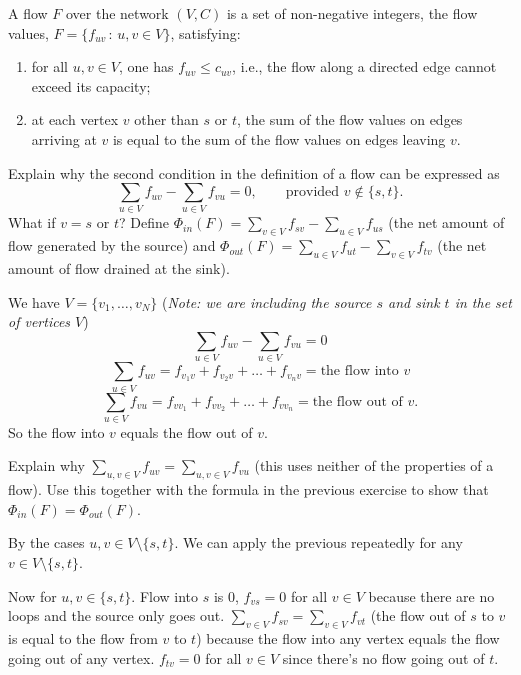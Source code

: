 \documentclass[10pt, a4paper]{article}
\begin{document}
\begin{definition}
    A flow $F$ over the network $(V, C)$ is a set of non-negative integers,
    the flow values,
    $F = \{f_{uv}\,:\, u, v \in V\}$,
    satisfying:
    \begin{enumerate}[label = (\roman*)]
        \item for all $u, v \in V$,
        one has $f_{uv} \leq c_{uv}$,
        i.e.,
        the flow along a directed edge cannot exceed its capacity;

        \item at each vertex $v$ other than $s$ or $t$,
        the sum of the flow values on edges arriving at $v$ is equal to the sum of the flow values on edges leaving $v$.
    \end{enumerate}
\end{definition}


\begin{example}
    Explain why the second condition in the definition of a flow can be expressed as
    \[
    \sum_{u \in V}f_{uv} - \sum_{u \in V}f_{vu} = 0,\qquad\text{provided $v \notin \{s, t\}$}.
    \]
    What if $v = s$ or $t$?
    Define $\Phi_{in}(F) = \sum_{v \in V}f_{sv} - \sum_{u \in V}f_{us}$
    (the net amount of flow generated by the source)
    and $\Phi_{out}(F) = \sum_{u \in V}f_{ut} - \sum_{v \in V}f_{tv}$
    (the net amount of flow drained at the sink).
    
    \begin{solution}
        We have $V = \{v_1, \dotsc, v_N\}$
        (\textit{Note:
        we are including the source $s$ and sink $t$ in the set of vertices $V$})
        \[
        \sum_{u \in V}f_{uv} - \sum_{u \in V}f_{vu} = 0
        \]
        \[
        \sum_{u \in V}f_{uv}  = f_{v_1v} + f_{v_2v} + \dotsc + f_{v_nv} = \text{the flow into $v$}
        \]
        \[
        \sum_{u \in V}f_{vu}  = f_{vv_1} + f_{vv_2} + \dotsc + f_{vv_n} = \text{the flow out of $v$}.
        \]
        So the flow into $v$ equals the flow out of $v$.
    \end{solution}
\end{example}

\begin{example}
    Explain why $\sum_{u, v \in V}f_{uv} = \sum_{u, v \in V}f_{vu}$
    (this uses neither of the properties of a flow).
    Use this together with the formula in the previous exercise to show that $\Phi_{in}(F) = \Phi_{out}(F)$.

    \begin{solution}
        By the cases $u, v \in V \setminus \{s, t\}$.
        We can apply the previous repeatedly for any $v \in V \setminus \{s, t\}$.

        Now for $u, v \in \{s, t\}$.
        Flow into $s$ is $0$,
        $f_{vs} = 0$ for all $v \in V$ because there are no loops and the source only goes out.
        $\sum_{v \in V}f_{sv} = \sum_{v \in V}f_{vt}$
        (the flow out of $s$ to $v$ is equal to the flow from $v$ to $t$)
        because the flow into any vertex equals the flow going out of any vertex.
        $f_{tv} = 0$ for all $v \in V$ since there's no flow going out of $t$.
    \end{solution}
\end{example}
\end{document}
